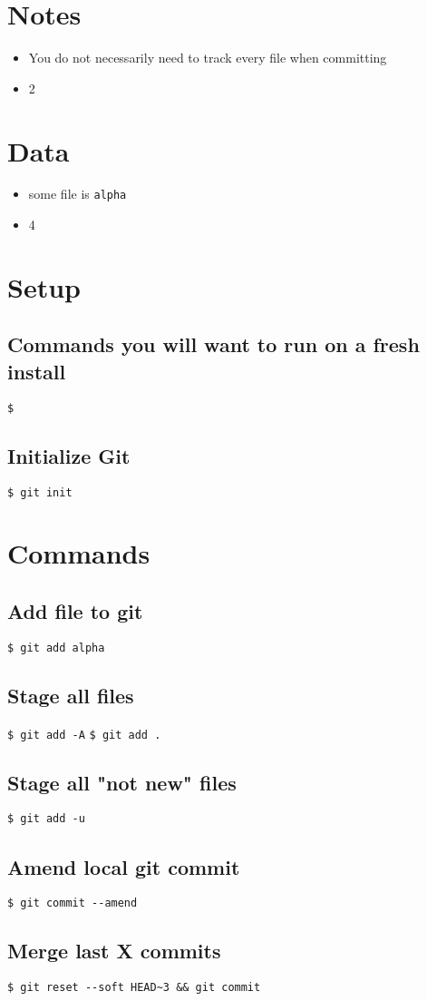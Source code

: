 \documentclass{article}
\title{\vspace{-2.25cm}{\small Git}\vspace{-1.5cm}}
\date{}
\begin{document}
\maketitle
\begin{multicols}{3}
\section{Notes}
\begin{itemize}
\item You do not necessarily need to track every file when committing
\item 2
\end{itemize}
\section{Data}
\begin{itemize}
\item some file is \texttt{alpha}
\item 4
\end{itemize}
\section{Setup}
\subsection{Commands you will want to run on a fresh install}
\lstinline|$ |
\subsection{Initialize Git}
\lstinline|$ git init|
\section{Commands}
\subsection{Add file to git}
\lstinline|$ git add alpha|
\subsection{Stage all files}
\lstinline|$ git add -A|
\lstinline|$ git add .|
\subsection{Stage all "not new" files}
\lstinline|$ git add -u|
\subsection{Amend local git commit}
\lstinline|$ git commit --amend|
\subsection{Merge last X commits}
\lstinline|$ git reset --soft HEAD~3 && git commit|
\end{multicols}
\end{document}
